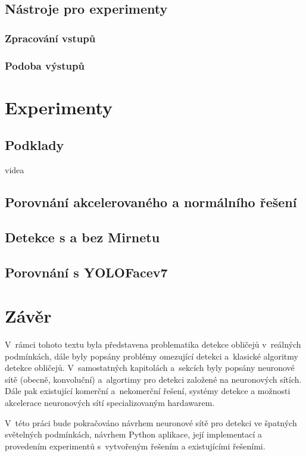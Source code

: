 \section{Nástroje pro experimenty}
\label{sekce:nastroje_pro_experimenty}

\subsection*{Zpracování vstupů}

\subsection*{Podoba výstupů}


\chapter{Experimenty}

\section{Podklady}
videa

\section{Porovnání akcelerovaného a normálního řešení}


\section{Detekce s a bez Mirnetu}

\section{Porovnání s YOLOFacev7}

\chapter{Závěr}
\label{kapitola:zaver}
V~rámci tohoto textu byla představena problematika detekce obličejů v~reálných podmínkách, dále byly popsány problémy omezující detekci a~klasické algoritmy detekce obličejů. V~samostatných kapitolách a~sekcích byly popsány neuronové sítě (obecně, konvoluční) a~algortimy pro detekci založené na neuronových sítích. Dále pak existující komerční a~nekomerční řešení, systémy detekce a možnosti akcelerace neuronových sítí specializovaným hardawarem.

V~této práci bude pokračováno návrhem neuronové sítě pro detekci ve špatných světelných podmínkách, návrhem Python aplikace, její implementací a provedením experimentů s~vytvořeným řešením a existujícími řešeními.